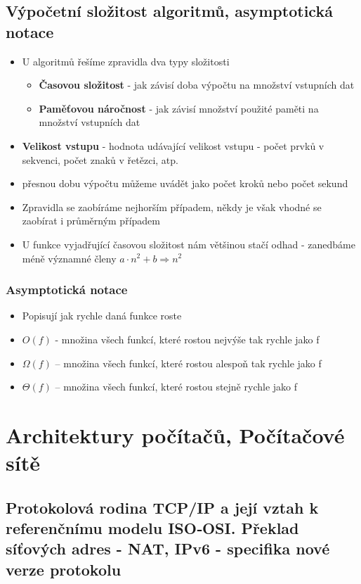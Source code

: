 \documentclass[10pt,a4paper]{article}
\begin{document}
\subsection{Výpočetní složitost algoritmů, asymptotická notace}\label{sec:uti_slozitost}
\begin{itemize}
\item U algoritmů řešíme zpravidla dva typy složitosti
\begin{itemize}
\item \textbf{Časovou složitost} - jak závisí doba výpočtu na množství vstupních dat
\item \textbf{Paměťovou náročnost} - jak závisí množství použité paměti na množství vstupních dat
\end{itemize}
\item \textbf{Velikost vstupu} - hodnota udávající velikost vstupu - počet prvků v sekvenci, počet znaků v řetězci, atp.
\item přesnou dobu výpočtu můžeme uvádět jako počet kroků nebo počet sekund
\item Zpravidla se zaobíráme nejhorším případem, někdy je však vhodné se zaobírat i průměrným případem
\item U funkce vyjadřující časovou složitost nám většinou stačí odhad - zanedbáme méně významné členy $a\cdot n^2+b \Rightarrow n^2$
\end{itemize}
\subsubsection{Asymptotická notace}
\begin{itemize}
\item Popisují jak rychle daná funkce roste
\item $O(f)$ - množina všech funkcí, které rostou nejvýše tak rychle jako f
\item $\Omega(f)$ – množina všech funkcí, které rostou alespoň tak rychle jako f
\item $\Theta(f)$ – množina všech funkcí, které rostou stejně rychle jako f
\end{itemize}
\newpage
\section{Architektury počítačů, Počítačové sítě}
\subsection{Protokolová rodina TCP/IP a její vztah k referenčnímu modelu ISO‐OSI. Překlad síťových adres - NAT, IPv6 - specifika nové verze protokolu}
\end{document}

